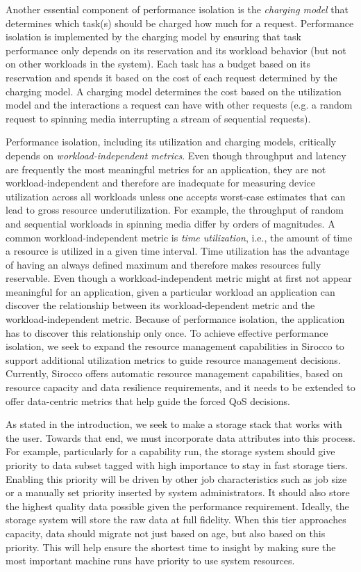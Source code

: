 Another essential component of performance isolation is the \emph{charging
model} that determines which task(s) should be charged how much for a request.
Performance isolation is implemented by the charging model by ensuring that
task performance only depends on its reservation and its workload behavior (but
not on other workloads in the system). Each task has a budget based on its
reservation and spends it based on the cost of each request determined by the
charging model. A charging model determines the cost based on the utilization
model and the interactions a request can have with other requests (e.g. a
random request to spinning media interrupting a stream of sequential requests).

Performance isolation, including its utilization and charging models,
critically depends on \emph{workload-independent metrics}. Even though
throughput and latency are frequently the most meaningful metrics for an
application, they are not workload-independent and therefore are inadequate for
measuring device utilization across all workloads unless one accepts
worst-case estimates that can lead to gross resource underutilization. For
example, the throughput of random and sequential workloads in spinning media
differ by orders of magnitudes. A common workload-independent metric is
\emph{time utilization}, i.e., the amount of time a resource is utilized in a
given time interval. Time utilization has the advantage of having an always
defined maximum and therefore makes resources fully reservable. Even though a
workload-independent metric might at first not appear meaningful for an
application, given a particular workload an application can discover the
relationship between its workload-dependent metric and the workload-independent
metric.  Because of performance isolation, the application has to discover this
relationship only once.  To achieve effective performance isolation, we seek to
expand the resource management capabilities in Sirocco to support additional
utilization metrics to guide resource management decisions. Currently, Sirocco
offers automatic resource management capabilities, based on resource capacity
and data resilience requirements, and it needs to be extended to offer
data-centric metrics that help guide the forced QoS decisions.

As stated in the introduction, we seek to make a storage stack that works with
the user. Towards that end, we must incorporate data attributes into this
process. For example, particularly for a capability run, the storage system
should give priority to data subset tagged with high importance to stay in fast
storage tiers. Enabling this priority will be driven by other job
characteristics such as job size or a manually set priority inserted by system
administrators. It should also store the highest quality data possible given
the performance requirement. Ideally, the storage system will store the raw
data at full fidelity. When this tier approaches capacity, data should migrate
not just based on age, but also based on this priority. This will help ensure
the shortest time to insight by making sure the most important machine runs
have priority to use system resources.

